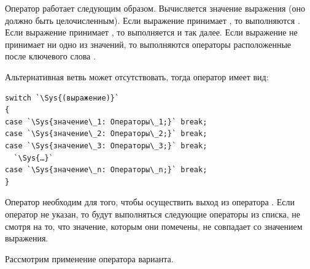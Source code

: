Оператор работает следующим образом. Вычисляется значение выражения (оно должно быть целочисленным). 
Если выражение принимает
, то выполняются . Если выражение принимает
, то выполняется  и так далее. Если выражение не принимает
ни одно из значений, то выполняются операторы расположенные после ключевого слова .

Альтернативная ветвь  может отсутствовать, тогда оператор имеет вид:
\begin{lstlisting}
switch `\Sys{(выражение)}`
{
case `\Sys{значение\_1: Операторы\_1;}` break;
case `\Sys{значение\_2: Операторы\_2;}` break;
case `\Sys{значение\_3: Операторы\_3;}` break;
  `\Sys{…}`
case `\Sys{значение\_n: Операторы\_n;}` break;
}
\end{lstlisting}

Оператор  необходим для того, чтобы осуществить выход из оператора .
Если оператор  не указан, то будут выполняться следующие операторы из списка, не смотря на то,
что значение, которым они помечены, не совпадает со значением выражения.

Рассмотрим применение оператора варианта.


